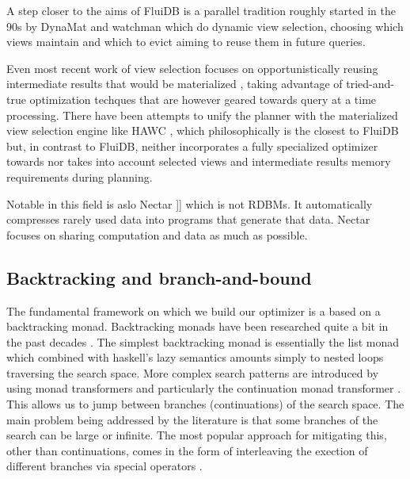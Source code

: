 A step closer to the aims of FluiDB is a parallel tradition roughly
started in the 90s by DynaMat \cite{kotidisDynamatDynamicView1999} and
watchman \cite{scheuermannWatchmanDataWarehouse1996} which do dynamic
view selection, choosing which views maintain and which to evict
aiming to reuse them in future queries.

Even most recent work of view selection focuses on opportunistically
reusing intermediate results that would be materialized
\cite{ivanovaArchitectureRecyclingIntermediates2010,nagelRecyclingPipelinedQuery2013},
taking advantage of tried-and-true optimization techques that are
however geared towards query at a time processing. There have been
attempts to unify the planner with the materialized view selection
engine like HAWC \cite{perezHistoryawareQueryOptimization2014a}, which
philosophically is the closest to FluiDB but, in contrast to FluiDB,
neither incorporates a fully specialized optimizer towards nor takes
into account selected views and intermediate results memory
requirements during planning.

Notable in this field is aslo Nectar
\cite{gundaNectarAutomaticManagement2010}]] which is not RDBMs. It
automatically compresses rarely used data into programs that generate
that data. Nectar focuses on sharing computation and data as much as
possible.

\subsection{Backtracking and branch-and-bound}

The fundamental framework on which we build our optimizer is a based
on a backtracking monad. Backtracking monads have been researched
quite a bit in the past decades
\cite{kiselyovBacktrackingInterleavingTerminating,hinzeEfficientMonadicstyleBacktracking,hinzeDerivingBacktrackingMonad2000a,fischerReinventingHaskellBacktracking2009}. The
simplest backtracking monad is essentially the list monad which
combined with haskell's lazy semantics amounts simply to nested loops
traversing the search space. More complex search patterns are
introduced by using monad transformers
\cite{hedgesMonadTransformersBacktracking2014} and particularly the
continuation monad transformer
\cite{hinzeMonadicStyleBacktracking1996}. This allows us to jump
between branches (continuations) of the search space. The main problem
being addressed by the literature is that some branches of the search
can be large or infinite. The most popular approach for mitigating
this, other than continuations, comes in the form of interleaving the
exection of different branches via special operators
\cite{kiselyovBacktrackingInterleavingTerminating2005}.

